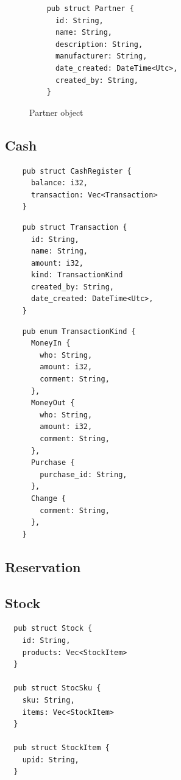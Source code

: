 \documentclass{article}
\begin{document}
\begin{figure}[!htb]
  \caption{Partner object}
  \begin{verbatim}
    pub struct Partner {
      id: String,
      name: String,
      description: String,
      manufacturer: String,
      date_created: DateTime<Utc>,
      created_by: String,
    }
  \end{verbatim}
\end{figure}

\newpage

\subsection{Cash}

\begin{verbatim}
    pub struct CashRegister {
      balance: i32,
      transaction: Vec<Transaction>
    }
  \end{verbatim}

\begin{verbatim}
    pub struct Transaction {
      id: String,
      name: String,
      amount: i32,
      kind: TransactionKind
      created_by: String,
      date_created: DateTime<Utc>,
    }
  \end{verbatim}

\begin{verbatim}
    pub enum TransactionKind {
      MoneyIn {
        who: String,
        amount: i32,
        comment: String,
      },
      MoneyOut {
        who: String,
        amount: i32,
        comment: String,
      },
      Purchase {
        purchase_id: String,
      },
      Change {
        comment: String,
      },
    }
  \end{verbatim}

\subsection{Reservation}

\subsection{Stock}

\begin{verbatim}
  pub struct Stock {
    id: String,
    products: Vec<StockItem>
  }

  pub struct StocSku {
    sku: String,
    items: Vec<StockItem>
  }

  pub struct StockItem {
    upid: String,
  }
\end{verbatim}
\end{document}
